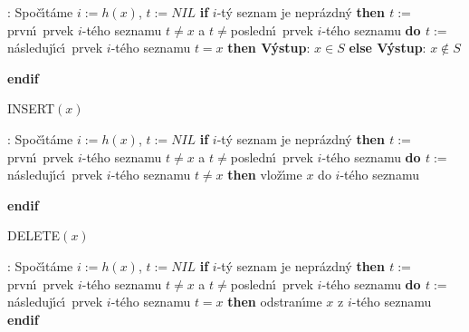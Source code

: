 :\newline 
Spo\v c\'\i t\'ame $i:=h\left(x\right)$, $t:=NIL$\newline 
{\bf if} $i$-t\'y seznam je nepr\'azdn\'y {\bf then\newline 
\phantom{{\rm ---}}$t:=$}prvn\'\i\ prvek $i$-t\'eho seznamu\newline 
\phantom{---}{\bf while} $t\ne x$ a $t\ne$posledn\'\i\ prvek $i$-t\'eho seznamu {\bf do\newline 
\phantom{{\rm ------}}$t:=$}n\'asleduj\'\i c\'\i\ prvek $i$-t\'eho seznamu\newline 
\phantom{---}{\bf enddo\newline 
endif\newline 
if} $t=x$ {\bf then V\'ystup}: $x\in S$ {\bf else V\'ystup}: $x\notin 
S$ {\bf endif
\medskip

\flushpar INSERT$\left(x\right)$}:\newline 
Spo\v c\'\i t\'ame $i:=h\left(x\right)$, $t:=NIL$\newline 
{\bf if} $i$-t\'y seznam je nepr\'azdn\'y {\bf then\newline 
\phantom{{\rm ---}}$t:=$}prvn\'\i\ prvek $i$-t\'eho seznamu\newline 
\phantom{---}{\bf while} $t\ne x$ a $t\ne$posledn\'\i\ prvek $i$-t\'eho seznamu {\bf do\newline 
\phantom{{\rm ------}}$t:=$}n\'asleduj\'\i c\'\i\ prvek $i$-t\'eho seznamu\newline 
\phantom{---}{\bf enddo\newline 
endif\newline 
if} $t\ne x$ {\bf then} vlo\v z\'\i me $x$ do $i$-t\'eho seznamu {\bf endif
\medskip

\flushpar DELETE$\left(x\right)$}:\newline 
Spo\v c\'\i t\'ame $i:=h\left(x\right)$, $t:=NIL$\newline 
{\bf if} $i$-t\'y seznam je nepr\'azdn\'y {\bf then\newline 
\phantom{{\rm ---}}$t:=$}prvn\'\i\ prvek $i$-t\'eho seznamu\newline 
\phantom{---}{\bf while} $t\ne x$ a $t\ne$posledn\'\i\ prvek $i$-t\'eho seznamu {\bf do\newline 
\phantom{{\rm ------}}$t:=$}n\'asleduj\'\i c\'\i\ prvek $i$-t\'eho seznamu\newline 
\phantom{---}{\bf enddo\newline 
endif\newline 
if} $t=x$ {\bf then} odstran\'\i me $x$ z $i$-t\'eho seznamu {\bf endif}
\bigskip


